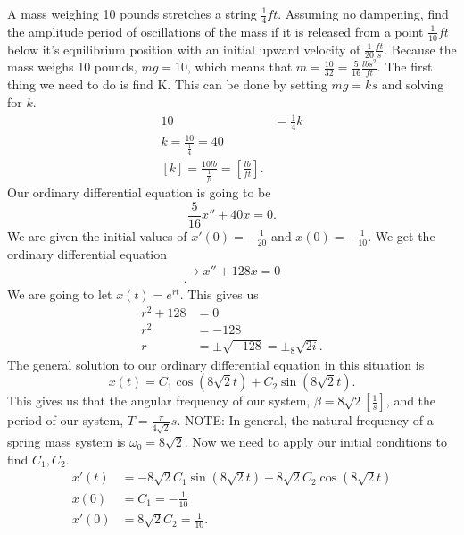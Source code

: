   \begin{eg}
    A mass weighing 10 pounds stretches a string $\frac{1}{4}ft$. Assuming no dampening, find the amplitude period of oscillations of the mass if it is released from a point $\frac{1}{10}ft$below it's equilibrium position with an initial upward velocity of $\frac{1}{20}\frac{ft}{s}$.\newline
    Because the mass weighs 10 pounds, $mg=10$, which means that $m=\frac{10}{32}=\frac{5}{16}\frac{lbs^2}{ft}$. The first thing we need to do is find K. This can be done by setting $mg=ks$ and solving for $k$.
    \begin{align*}
      10&=\frac{1}{4}k\\
      k=\frac{10}{\frac{1}{4}}=40\\
      [k]=\frac{10lb}{\frac{1}{ft}}=\left[\frac{lb}{ft}\right]
    .\end{align*}
    Our ordinary differential equation is going to be 
    \[
    \frac{5}{16}x''+40x=0
    .\] 
    We are given the initial values of $x'(0)=-\frac{1}{20}$ and $x(0)=-\frac{1}{10}$. We get the ordinary differential  equation 
    \begin{align*}
      \to x''+128x=0\\
    .\end{align*}
    We are going to let $x(t)=e^{rt}$. This gives us 
    \begin{align*}
      r^2+128&=0\\
      r^2&=-128\\
      r&=\pm\sqrt{-128}=\pm_8\sqrt{2i} 
    .\end{align*}
    The general solution to our ordinary differential equation in this situation is 
    \[
      x(t)=C_1\cos\left( 8\sqrt{2} t \right) +C_2\sin\left( 8\sqrt{2} t \right) 
    .\]
    This gives us that the angular frequency of our system, $\beta=8\sqrt{2} \left[ \frac{1}{s} \right] $, and the period of our system, $T=\frac{\pi}{4\sqrt{2} }s$.\newline
    NOTE: In general, the natural frequency of a spring mass system is $\omega_0=8\sqrt{2} $.\newline
    Now we need to apply our initial conditions to find $C_1,C_2 $.
    \begin{align*}
      x'(t)&=-8\sqrt{2} C_1\sin\left( 8\sqrt{2} t \right) +8\sqrt{2} C_2\cos\left( 8\sqrt{2} t \right) \\
      x(0)&=C_1=-\frac{1}{10}\\
      x'(0)&=8\sqrt{2} C_2=\frac{1}{10}
    .\end{align*}

\end{eg}
